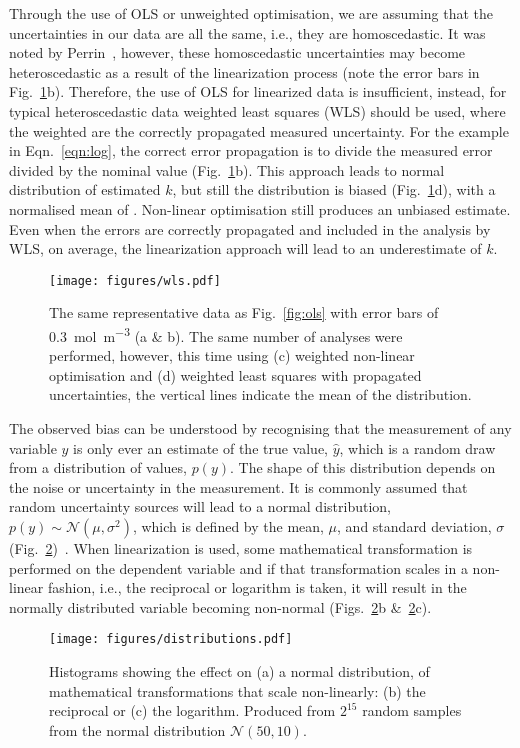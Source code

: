 \documentclass[journal=jceda8,manuscript=article]{achemso}
\begin{document}
Through the use of OLS or unweighted optimisation, we are assuming that the uncertainties in our data are all the same, i.e., they are homoscedastic. 
It was noted by Perrin~\cite{perrin_linear_2017}, however, these homoscedastic uncertainties may become heteroscedastic as a result of the linearization process (note the error bars in Fig.~\ref{fig:wls}b). 
Therefore, the use of OLS for linearized data is insufficient, instead, for typical heteroscedastic data weighted least squares (WLS) should be used, where the weighted are the correctly propagated measured uncertainty. 
For the example in Eqn.~\ref{eqn:log}, the correct error propagation is to divide the measured error divided by the nominal value (Fig.~\ref{fig:wls}b).
This approach leads to normal distribution of estimated $k$, but still the distribution is biased (Fig.~\ref{fig:wls}d), with a normalised mean of .
Non-linear optimisation still produces an unbiased estimate. 
Even when the errors are correctly propagated and included in the analysis by WLS, on average, the linearization approach will lead to an underestimate of $k$.
%
\begin{figure}
  \texttt{[image: figures/wls.pdf]}
  \caption{
    The same representative data as Fig.~\ref{fig:ols} with error bars of \SI{0.3}{{\mol\m^{-3}}} (a \& b).
    The same number of analyses were performed, however, this time using (c) weighted non-linear optimisation and (d) weighted least squares with propagated uncertainties, the vertical lines indicate the mean of the distribution. 
    }
  \label{fig:wls}
\end{figure}
%

The observed bias can be understood by recognising that the measurement of any variable $y$ is only ever an estimate of the true value, $\hat{y}$, which is a random draw from a distribution of values, $p(y)$. 
The shape of this distribution depends on the noise or uncertainty in the measurement. 
It is commonly assumed that random uncertainty sources will lead to a normal distribution, $p(y) \sim \mathcal{N}(\mu, \sigma^2)$, which is defined by the mean, $\mu$, and standard deviation, $\sigma$ (Fig.~\ref{fig:distributions})~\cite{monk_math_2010}.
When linearization is used, some mathematical transformation is performed on the dependent variable and if that transformation scales in a non-linear fashion, i.e., the reciprocal or logarithm is taken, it will result in the normally distributed variable becoming non-normal (Figs.~\ref{fig:distributions}b \&~\ref{fig:distributions}c).
%
\begin{figure}
  \texttt{[image: figures/distributions.pdf]}
  \caption{  
    Histograms showing the effect on (a) a normal distribution, of mathematical transformations that scale non-linearly: (b) the reciprocal or (c) the logarithm. 
    Produced from $2^{15}$ random samples from the normal distribution $\mathcal{N}(50, 10)$.
    }
  \label{fig:distributions}
\end{figure}
%
\end{document}
